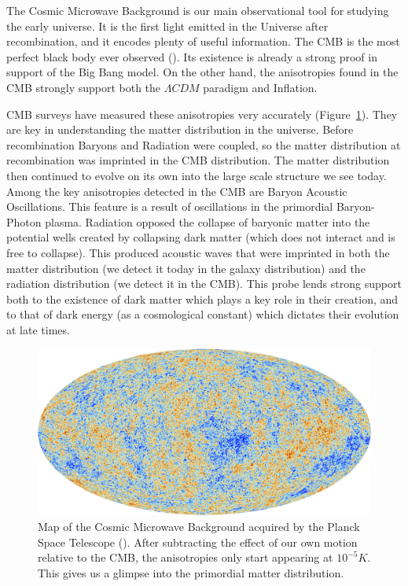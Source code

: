 The Cosmic Microwave Background is our main observational tool for studying the early universe. It is the first light emitted in the Universe after recombination, and it encodes plenty of useful information. The CMB is the most perfect black body ever observed (\cite{1999dpf..conf.....W}). Its existence is already a strong proof in support of the Big Bang model. On the other hand, the anisotropies found in the CMB strongly support both the $\Lambda CDM$ paradigm and Inflation.

CMB surveys have measured these anisotropies very accurately (Figure~\ref{fig:1.1}). They are key in understanding the matter distribution in the universe. Before recombination Baryons and Radiation were coupled, so the matter distribution at recombination was imprinted in the CMB distribution. The matter distribution then continued to evolve on its own into the large scale structure we see today. Among the key anisotropies detected in the CMB are Baryon Acoustic Oscillations. This feature is a result of oscillations in the primordial Baryon-Photon plasma. Radiation opposed the collapse of baryonic matter into the potential wells created by collapsing dark matter (which does not interact and is free to collapse). This produced acoustic waves that were imprinted in both the matter distribution (we detect it today in the galaxy distribution) and the radiation distribution (we detect it in the CMB). This probe lends strong support both to the existence of dark matter which plays a key role in their creation, and to that of dark energy (as a cosmological constant) which dictates their evolution at late times.

\begin{figure}
    \centering
    \includegraphics[width=0.9\columnwidth]{images/misc/Planck_CMB.jpg}%
    

    \caption{
    Map of the Cosmic Microwave Background acquired by the Planck Space Telescope (\cite{2016A&A...594A..13P}). After subtracting the effect of our own motion relative to the CMB, the anisotropies only start appearing at $10^{-5} K$. This gives us a glimpse into the primordial matter distribution.
    }
    
    \label{fig:1.1}
\end{figure}

